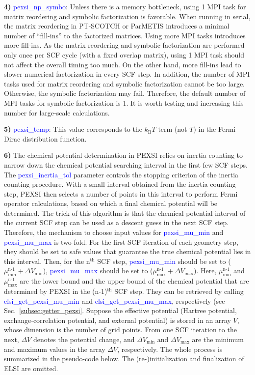\documentclass{report}
\newcommand{\tcb}[1]{\textcolor{blue}{#1}}
\begin{document}
\textbf{4)} \tcb{pexsi\_np\_symbo}: Unless there is a memory bottleneck, using 1 MPI task for matrix reordering and symbolic factorization is favorable. When running in serial, the matrix reordering in PT-SCOTCH or ParMETIS introduces a minimal number of ``fill-ins'' to the factorized matrices. Using more MPI tasks introduces more fill-ins. As the matrix reordering and symbolic factorization are performed only once per SCF cycle (with a fixed overlap matrix), using 1 MPI task should not affect the overall timing too much. On the other hand, more fill-ins lead to slower numerical factorization in every SCF step. In addition, the number of MPI tasks used for matrix reordering and symbolic factorization cannot be too large. Otherwise, the symbolic factorization may fail. Therefore, the default number of MPI tasks for symbolic factorization is 1. It is worth testing and increasing this number for large-scale calculations.

\textbf{5)} \tcb{pexsi\_temp}: This value corresponds to the $k_\text{B} T$ term (not $T$) in the Fermi-Dirac distribution function.

\textbf{6)} The chemical potential determination in PEXSI relies on inertia counting to narrow down the chemical potential searching interval in the first few SCF steps. The \tcb{pexsi\_inertia\_tol} parameter controls the stopping criterion of the inertia counting procedure. With a small interval obtained from the inertia counting step, PEXSI then selects a number of points in this interval to perform Fermi operator calculations, based on which a final chemical potential will be determined. The trick of this algorithm is that the chemical potential interval of the current SCF step can be used as a descent guess in the next SCF step. Therefore, the mechanism to choose input values for \tcb{pexsi\_mu\_min} and \tcb{pexsi\_mu\_max} is two-fold. For the first SCF iteration of each geometry step, they should be set to safe values that guarantee the true chemical potential lies in this interval. Then, for the n$^\text{th}$ SCF step, \tcb{pexsi\_mu\_min} should be set to ($\mu_\text{min}^\text{n-1} + \Delta V_\text{min}$), \tcb{pexsi\_mu\_max} should be set to ($\mu_\text{max}^\text{n-1} + \Delta V_\text{max}$). Here, $\mu_\text{min}^\text{n-1}$ and $\mu_\text{max}^\text{n-1}$ are the lower bound and the upper bound of the chemical potential that are determined by PEXSI in the (n-1)$^\text{th}$ SCF step. They can be retrieved by calling \tcb{elsi\_get\_pexsi\_mu\_min} and \tcb{elsi\_get\_pexsi\_mu\_max}, respectively (see Sec.~\ref{subsec:getter_pexsi}. Suppose the effective potential (Hartree potential, exchange-correlation potential, and external potential) is stored in an array $V$, whose dimension is the number of grid points. From one SCF iteration to the next, $\Delta V$ denotes the potential change, and $\Delta V_\text{min}$ and $\Delta V_\text{max}$ are the minimum and maximum values in the array $\Delta V$, respectively. The whole process is summarized in the pseudo-code below. The (re-)initialization and finalization of ELSI are omitted.
\end{document}
